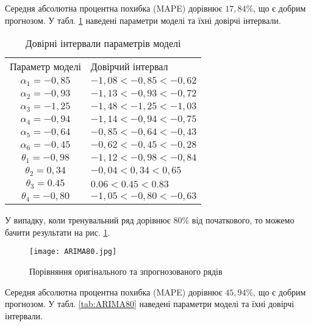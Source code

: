 
Середня абсолютна процентна похибка (MAPE) дорівнює $17,84\%$, що є добрим прогнозом. У табл. \ref{tab:ARIMA90} наведені параметри моделі та їхні довірчі інтервали.

\begin{table}[h]
\caption{Довірні інтервали параметрів моделі}\label{tab:ARIMA90}
\begin{tabular}{|c|m{}|}
\hline
Параметр моделі & Довірчий інтервал \\
		\hlinewd{2pt}
$\alpha_{1} = -0,85$ & $-1,08 < -0,85 < -0,62$ \\
\hline
$\alpha_{2} = -0,93$ & $-1,13 < -0,93 < -0,72$ \\
\hline
$\alpha_{3} = -1,25$ & $-1,48 < -1,25 < -1,03$ \\
\hline
$\alpha_{4} = -0,94$ & $-1,14 < -0,94 < -0,75$ \\
\hline
$\alpha_{5} = -0,64$ & $-0,85 < -0,64 < -0,43$ \\
\hline
$\alpha_{6} = -0,45$ & $-0,62 < -0,45 < -0,28$ \\
\hline
$\theta_{1} = -0,98$ & $-1,12 < -0,98 < -0,84$ \\
\hline
$\theta_{2} = 0,34$ & $-0,04 < 0,34 < 0,65$ \\
\hline
$\theta_{3} = 0.45$ & $0.06 < 0.45 < 0.83$ \\
\hline
$\theta_{4} = -0,80$ & $-1,05 < -0,80 < -0,63$ \\
\hline
\end{tabular}
\end{table}

У випадку, коли тренувальний ряд дорівнює $80\%$ від початкового, то можемо бачити результати на рис. \ref{fig:ARIMA80}.

\newpage

\vspace{1em}

\begin{figure}[h]
  \texttt{[image: ARIMA80.jpg]}
  \caption{Порівняння оригінального та зпрогнозованого рядів}
  \label{fig:ARIMA80}
\end{figure}

Середня абсолютна процентна похибка (MAPE) дорівнює $45,94\%$, що є добрим прогнозом. У табл. \ref{tab:ARIMA80} наведені параметри моделі та їхні довірчі інтервали.

